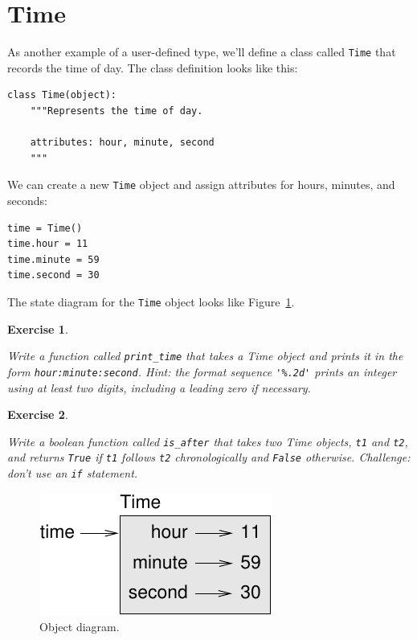 \documentclass[12pt,a4paper,final,twoside,onecolumn,titlepage]{book}
\newtheorem{exercise}{Exercise}[chapter]
\begin{document}
\section{Time}
\label{time.object}

As another example of a user-defined type, we'll define a class called
{\tt Time} that records the time of day.  The class definition looks
like this:

\begin{verbatim}
class Time(object):
    """Represents the time of day.
       
    attributes: hour, minute, second
    """
\end{verbatim}
%
We can create a new {\tt Time} object and assign
attributes for hours, minutes, and seconds:

\begin{verbatim}
time = Time()
time.hour = 11
time.minute = 59
time.second = 30
\end{verbatim}
%
The state diagram for the {\tt Time} object looks like Figure~\ref{fig.time}.

\begin{exercise}
\label{ex.printtime}

Write a function called \verb"print_time" that takes a 
Time object and prints it in the form {\tt hour:minute:second}.
Hint: the format sequence \verb"'%.2d'" prints an integer using
at least two digits, including a leading zero if necessary.

\end{exercise}

\begin{exercise}
\label{isafter}

Write a boolean function called \verb"is_after" that
takes two Time objects, {\tt t1} and {\tt t2}, and
returns {\tt True} if {\tt t1} follows {\tt t2} chronologically and
{\tt False} otherwise.  Challenge: don't use an {\tt if} statement.
\end{exercise}

\begin{figure}
\centerline
{\includegraphics[scale=0.8]{figs/time.pdf}}
\caption{Object diagram.}
\label{fig.time}
\end{figure}
\end{document}
